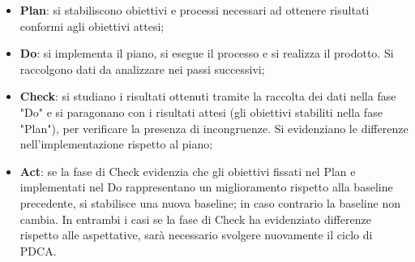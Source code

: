 \begin{itemize}
\item \textbf{Plan}: si stabiliscono obiettivi e processi necessari ad ottenere risultati conformi agli obiettivi attesi;
\item \textbf{Do}: si implementa il piano, si esegue il processo e si realizza il prodotto. Si raccolgono dati da analizzare nei passi successivi;
\item \textbf{Check}: si studiano i risultati ottenuti tramite la raccolta dei dati nella fase "Do" e si paragonano con i risultati attesi (gli obiettivi stabiliti nella fase "Plan"), per verificare la presenza di incongruenze. Si evidenziano le differenze nell'implementazione rispetto al piano;
\item \textbf{Act}: se la fase di Check evidenzia che gli obiettivi fissati nel Plan e implementati nel Do rappresentano un miglioramento rispetto alla baseline precedente, si stabilisce una nuova baseline; in caso contrario la baseline non cambia. In entrambi i casi se la fase di Check ha evidenziato differenze rispetto alle aspettative, sarà necessario svolgere nuovamente il ciclo di PDCA.
\end{itemize}